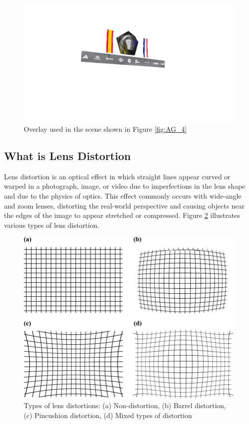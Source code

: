 \begin{figure}[h]
    \centering
    \includegraphics[width=\textwidth]{Images/02stateart/AG_4_overlay.jpeg}
    \caption{Overlay used in the scene shown in Figure \ref{fig:AG_4}}
    \label{fig:AG4_overlay}
\end{figure}

\subsection{What is Lens Distortion}

\noindent Lens distortion is an optical effect in which straight lines appear curved or warped in a photograph, image, or video due to imperfections in the lens shape and due to the physics of optics. This effect commonly occurs with wide-angle and zoom lenses, distorting the real-world perspective and causing objects near the edges of the image to appear stretched or compressed. Figure \ref{fig:lens} illustrates various types of lens distortion.

\begin{figure}[h]
    \centering
    \includegraphics[width=\textwidth]{Images/02stateart/Types-of-lens-distortion-a-Non-distortion-b-Barrel-distortion-c-Pincushion.tif.png}
    \caption{Types of lens distortions: (a) Non-distortion, (b) Barrel distortion, (c) Pincushion distortion, (d) Mixed types of distortion}
    \label{fig:lens}
\end{figure}

